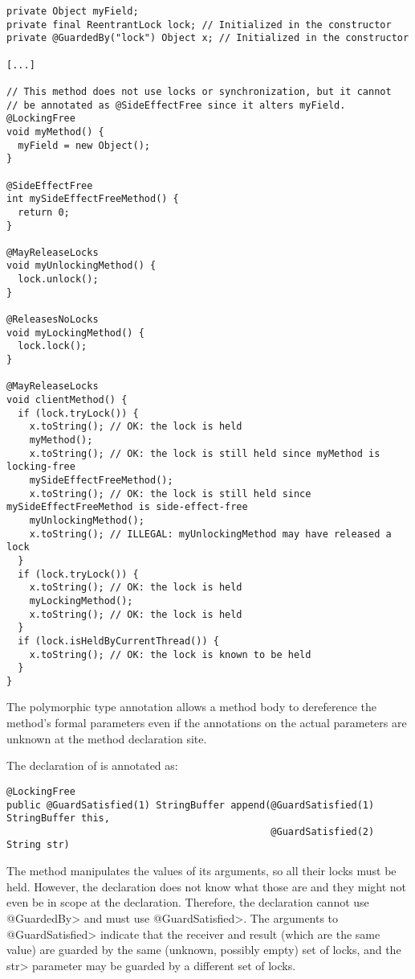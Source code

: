 \begin{verbatim}
private Object myField;
private final ReentrantLock lock; // Initialized in the constructor
private @GuardedBy("lock") Object x; // Initialized in the constructor

[...]

// This method does not use locks or synchronization, but it cannot
// be annotated as @SideEffectFree since it alters myField.
@LockingFree
void myMethod() {
  myField = new Object();
}

@SideEffectFree
int mySideEffectFreeMethod() {
  return 0;
}

@MayReleaseLocks
void myUnlockingMethod() {
  lock.unlock();
}

@ReleasesNoLocks
void myLockingMethod() {
  lock.lock();
}

@MayReleaseLocks
void clientMethod() {
  if (lock.tryLock()) {
    x.toString(); // OK: the lock is held
    myMethod();
    x.toString(); // OK: the lock is still held since myMethod is locking-free
    mySideEffectFreeMethod();
    x.toString(); // OK: the lock is still held since mySideEffectFreeMethod is side-effect-free
    myUnlockingMethod();
    x.toString(); // ILLEGAL: myUnlockingMethod may have released a lock
  }
  if (lock.tryLock()) {
    x.toString(); // OK: the lock is held
    myLockingMethod();
    x.toString(); // OK: the lock is held
  }
  if (lock.isHeldByCurrentThread()) {
    x.toString(); // OK: the lock is known to be held
  }
}
\end{verbatim}



The polymorphic  type annotation allows a method body
to dereference the method's formal parameters even if the
 annotations on the actual parameters are unknown at
the method declaration site.

The declaration of
is annotated as:

\begin{verbatim}
@LockingFree
public @GuardSatisfied(1) StringBuffer append(@GuardSatisfied(1) StringBuffer this,
                                              @GuardSatisfied(2) String str)
\end{verbatim}

The method manipulates the values of its arguments, so all their locks must
be held.  However, the declaration does not know what those are and they
might not even be in scope at the declaration.  Therefore, the declaration
cannot use \<@GuardedBy> and must use \<@GuardSatisfied>.  The arguments to
\<@GuardSatisfied> indicate that the receiver and result (which are the
same value) are guarded by the same (unknown, possibly empty) set of locks,
and the \<str> parameter may be guarded by a different set of locks.

